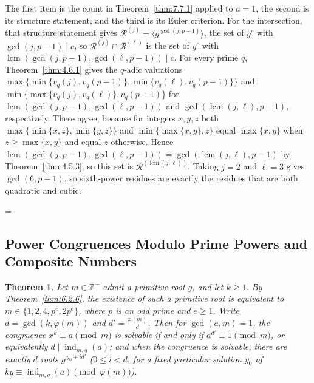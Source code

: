 \documentclass[11pt]{article}
\makeatletter
\theoremstyle{ntstyle}
\newtheorem{theorem}{Theorem}[subsection]
\let\nt@closedisplay\]
\def\nt@guardedclose{\@ifnextchar\par{\nt@closeafterpar}{\@ifnextchar\end{\postdisplaypenalty\@M\nt@closedisplay}{\nt@closedisplay}}}
\def\nt@closeafterpar\par{\@ifnextchar\par{\nt@closeafterpar}{\@ifnextchar\end{\postdisplaypenalty\@M\nt@closedisplay\par}{\nt@closedisplay\par}}}
\renewenvironment{proof}[1][\proofname]{\par
  \pushQED{\qed}\normalfont\topsep\medskipamount\edef\nt@afterproof{\@endparpenalty=\the\@endparpenalty\relax}\@beginparpenalty\@M\@endparpenalty\@M\let\]\nt@guardedclose\trivlist\item[]\textit{#1\@addpunct{.}} \ignorespaces}{\ifvmode\addpenalty\@M\fi\popQED\nt@afterproof\endtrivlist\@endpefalse}
\DeclareMathOperator{\lcm}{lcm}
\DeclareMathOperator{\ind}{ind}
\makeatother
\begin{document}
\begin{proof} The first item is the count in Theorem~\ref{thm:7.7.1}
	applied to $a = 1$, the second is its structure statement, and the third is
	its Euler criterion. For the intersection, that
	structure statement gives $\mathcal{R}^{(j)} = \langle g^{\gcd(j,
				p-1)}\rangle$, the set of $g^{c}$ with $\gcd(j, p-1) \mid c$, so
	$\mathcal{R}^{(j)} \cap \mathcal{R}^{(\ell)}$ is the set of $g^{c}$ with
	$\lcm(\gcd(j, p-1), \gcd(\ell, p-1)) \mid c$. For every prime $q$,
	Theorem~\ref{thm:4.6.1} gives the $q$-adic valuations
	$\max\{\min\{v_q(j),v_q(p-1)\},\min\{v_q(\ell),v_q(p-1)\}\}$ and
	$\min\{\max\{v_q(j),v_q(\ell)\},v_q(p-1)\}$ for $\lcm(\gcd(j, p-1), \gcd(\ell, p-1))$
	and $\gcd(\lcm(j, \ell), p-1)$, respectively. These agree, because for integers
	$x,y,z$ both $\max\{\min\{x,z\},\min\{y,z\}\}$ and $\min\{\max\{x,y\},z\}$ equal
	$\max\{x,y\}$ when $z\ge\max\{x,y\}$ and equal $z$ otherwise. Hence
	$\lcm(\gcd(j, p-1), \gcd(\ell, p-1)) =
		\gcd(\lcm(j, \ell), p-1)$ by Theorem~\ref{thm:4.5.3}, so this set is
	$\mathcal{R}^{(\lcm(j, \ell))}$. Taking $j = 2$ and $\ell = 3$
	gives $\gcd(6, p-1)$, so sixth-power residues are exactly the residues
	that are both quadratic and cubic.

\end{proof}
\subsection{Power Congruences Modulo Prime Powers and Composite Numbers}

\begin{theorem}\label{thm:7.8.1} Let $m\in\mathbb{Z}^+$ admit a primitive root
	$g$, and let $k\ge1$. By Theorem~\ref{thm:6.2.6}, the existence of such a primitive root is equivalent to
	$m\in\{1,2,4,p^e,2p^e\}$, where $p$ is an odd prime and $e\ge1$.
	Write $d = \gcd(k, \varphi(m))$ and
	$d' = \frac{\varphi(m)}{d}$. Then
	for $\gcd(a,m)=1$, the congruence $x^k\equiv a\pmod{m}$ is solvable
	if and only if $a^{d'} \equiv 1\pmod{m}$, or equivalently $d \mid \ind_{m,g}(a)$; and when
	the congruence is solvable, there
	are exactly $d$ roots $g^{\,y_0 + id'}$ ($0 \le i < d$, for a fixed
	particular solution $y_0$ of $ky\equiv\ind_{m,g}(a)\pmod{\varphi(m)}$).

\end{theorem}
\end{document}
